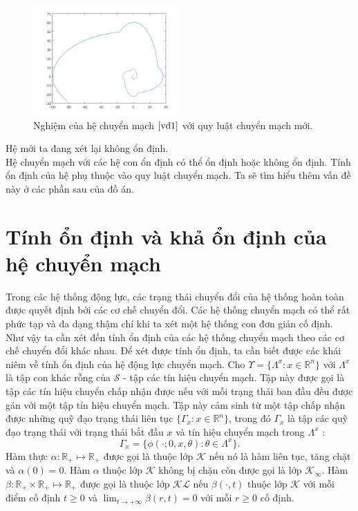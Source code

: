 \documentclass[14pt,a4paper,oneside]{report}		%
\theoremstyle{definition}
\begin{document}
\begin{figure}[h]
\centering
\includegraphics[width=0.5\textwidth]{graph10.png}
\caption{Nghiệm của hệ chuyển mạch $\ref{vd1}$ với quy luật chuyển mạch mới.}\label{fig:3}
\end{figure}
\newpage
Hệ mới ta đang xét lại không ổn định.\\

Hệ chuyển mạch với các hệ con ổn định có thể ổn định hoặc không ổn định. Tính ổn định của hệ phụ thuộc vào quy luật chuyển mạch. Ta sẽ tìm hiểu thêm vấn đề này ở các phần sau của đồ án.
\section{Tính ổn định và khả ổn định của hệ chuyển mạch}
Trong các hệ thống động lực, các trạng thái chuyển đổi của hệ thống hoàn toàn được quyết định bởi các cơ chế chuyển đổi. Các hệ thống chuyển mạch có thể rất phức tạp và đa dạng thậm chí khi ta xét một hệ thống con đơn giản cố định. Như vậy ta cần xét đến tính ổn định của các hệ thống chuyển mạch theo các cơ chế chuyển đổi khác nhau. Để xét được tính ổn định, ta cần biết được các khái niêm về tính ổn định của hệ động lực chuyển mạch.
Cho $\Upsilon = \{\Lambda^x:x\in\mathbb{R}^n\}$ với $\Lambda^x$ là tập con khác rỗng của $\mathcal{S}$ - tập các tín hiệu chuyển mạch. Tập này được gọi là tập các tín hiệu chuyển chấp nhận được nếu với mỗi trạng thái ban đầu đều được gán với một tập tín hiệu chuyển mạch. Tập này cảm sinh từ một tập chấp nhận được những quỹ đạo trạng thái liên tục $\{\Gamma_x:x\in\mathbb{R}^n\}$, trong đó $\Gamma_x$ là tập các quỹ đạo trạng thái với trạng thái bắt đầu $x$ và tín hiệu chuyển mạch trong $\Lambda^x$ :
$$\Gamma_x = \{\phi(\cdot;0,x,\theta):\theta\in\Lambda^x\}.$$
Hàm thực $\alpha :\mathbb{R}_+ \mapsto \mathbb{R}_+$ được gọi là thuộc lớp $\mathcal{K}$ nếu nó là hàm liên tục, tăng chặt và $\alpha(0)=0$. Hàm $\alpha$ thuộc lớp $\mathcal{K}$ không bị chặn còn được gọi là lớp $\mathcal{K}_\infty$. Hàm $\beta : \mathbb{R}_+ \times \mathbb{R}_+ \mapsto \mathbb{R}_+$ được gọi là thuộc lớp $\mathcal{KL}$ nếu $\beta(\cdot,t)$ thuộc lớp $\mathcal{K}$ với mỗi điểm cố định $t \geq 0$ và $\lim_{t\rightarrow +\infty}\beta(r,t)=0$ với mỗi $r\geq 0$ cố định.
\end{document}
